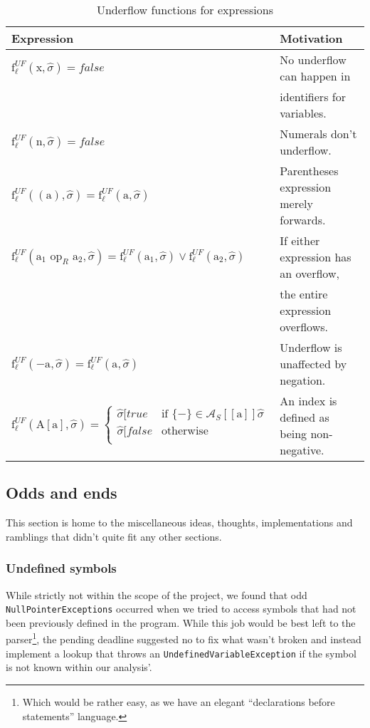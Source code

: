 \begin{table}[h]
\begin{tabular}{| l | l |}
  \hline
  Expression & Motivation\\
  \hline
  \hline
  $\text{f}_\ell^{UF} (\text{x},\widehat{\sigma}) = false $ & No underflow can happen in \\ 
                                                            & identifiers for variables.\\
  \hline
  $\text{f}_\ell^{UF} (\text{n},\widehat{\sigma}) = false $ & Numerals don't underflow.\\
  \hline
  $\text{f}_\ell^{UF} ((\text{a}),\widehat{\sigma}) = \text{f}_\ell^{UF} (\text{a},\widehat{\sigma}) $ & Parentheses expression merely forwards.\\
  \hline
  $\text{f}_\ell^{UF} (\text{a}_1 \text{ op}_R \text{ a}_2,\widehat{\sigma}) = \text{f}_\ell^{UF} (\text{a}_1,\widehat{\sigma}) \vee \text{f}_\ell^{UF} (\text{a}_2,\widehat{\sigma}) $ & If either expression has an overflow,\\
                                & the entire expression overflows.\\
  \hline
  $\text{f}_\ell^{UF} (-\text{a},\widehat{\sigma}) = \text{f}_\ell^{UF} (\text{a},\widehat{\sigma}) $ & Underflow is unaffected by negation.\\
  \hline
  $\text{f}_\ell^{UF} (\text{A}[\text{a}],\widehat{\sigma}) = 
     \begin{cases} 
        \widehat{\sigma}[true   & \text{if } \{-\} \in \mathcal{A}_S [\![\text{a}]\!]\widehat{\sigma}\\
        \widehat{\sigma}[false  & \text{otherwise} \\
     \end{cases}
   $ & An index is defined as being non-negative.\\
  \hline
\end{tabular}
\centering
\caption{Underflow functions for expressions}
\label{table:underflow_functions_expressions}
\end{table}


\subsection{Odds and ends}
This section is home to the miscellaneous ideas, thoughts, implementations and ramblings that didn't quite fit any other sections.

\subsubsection{Undefined symbols}
While strictly not within the scope of the project, we found that odd \texttt{NullPointerExceptions} occurred when we tried to access symbols that had not been previously defined in the program. While this job would be best left to the parser\footnote{Which would be rather easy, as we have an elegant ``declarations before statements'' language.}, the pending deadline suggested no to fix what wasn't broken and instead implement a lookup that throws an \texttt{UndefinedVariableException} if the symbol is not known within our analysis'.

